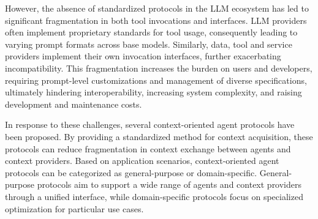 \documentclass[10pt,preprint]{article}
\begin{document}
However, the absence of standardized protocols in the LLM ecosystem has led to significant fragmentation in both tool invocations and interfaces. LLM providers often implement proprietary standards for tool usage, consequently leading to varying prompt formats across base models. Similarly, data, tool and service providers implement their own invocation interfaces, further exacerbating incompatibility. This fragmentation increases the burden on users and developers, requiring prompt-level customizations and management of diverse specifications, ultimately hindering interoperability, increasing system complexity, and raising development and maintenance costs.

In response to these challenges, several context-oriented agent protocols have been proposed. By providing a standardized method for context acquisition, these protocols can reduce fragmentation in context exchange between agents and context providers. Based on application scenarios, context-oriented agent protocols can be categorized as general-purpose or domain-specific. General-purpose protocols aim to support a wide range of agents and context providers through a unified interface, while domain-specific protocols focus on specialized optimization for particular use cases.
\end{document}
